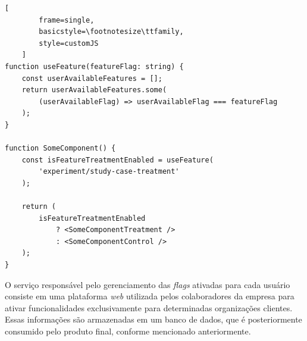 \begin{code}[!ht]
    \caption{Uso do \textit{Feature Gate}}
    \begin{lstlisting}[
        frame=single,
        basicstyle=\footnotesize\ttfamily,
        style=customJS
    ]
function useFeature(featureFlag: string) {
    const userAvailableFeatures = [];
    return userAvailableFeatures.some(
        (userAvailableFlag) => userAvailableFlag === featureFlag
    );
}

function SomeComponent() {
    const isFeatureTreatmentEnabled = useFeature(
        'experiment/study-case-treatment'
    );

    return (
        isFeatureTreatmentEnabled
            ? <SomeComponentTreatment />
            : <SomeComponentControl />
    );
}
    \end{lstlisting}
    \label{code:feature-gate}
\end{code}

O serviço responsável pelo gerenciamento das \textit{flags} ativadas para cada usuário consiste em uma plataforma \textit{web} utilizada pelos colaboradores da empresa para ativar funcionalidades exclusivamente para determinadas organizações clientes. Essas informações são armazenadas em um banco de dados, que é posteriormente consumido pelo produto final, conforme mencionado anteriormente.
